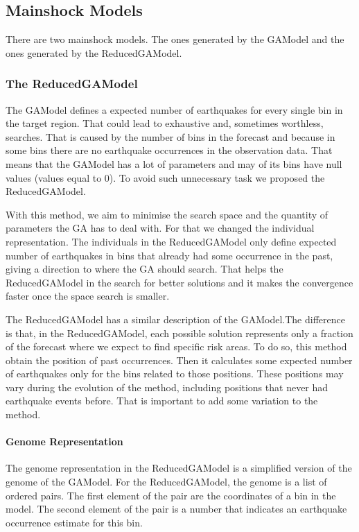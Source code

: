 \subsection{Mainshock Models}\label{mainshocksMethods}
There are two mainshock models. The ones generated by the GAModel and the ones generated by the ReducedGAModel.

\subsubsection{The ReducedGAModel}\label{ReducedGAModel}
The GAModel defines a expected number of earthquakes for every single bin in the target region. That could lead to exhaustive and, sometimes worthless, searches. That is caused by the number of bins in the forecast and because in some bins there are no earthquake occurrences in the observation data. That means that the GAModel has a lot of parameters and may of its bins have null values (values equal to 0). To avoid such unnecessary task we proposed the ReducedGAModel.

With this method, we aim to minimise the search space and the quantity of parameters the GA has to deal with. For that we changed the individual representation. The individuals in the ReducedGAModel only define expected number of earthquakes in bins that already had some occurrence in the past, giving a direction to where the GA should search. That helps the ReducedGAModel in the search for better solutions and it makes the convergence faster once the space search is smaller.

The ReducedGAModel has a similar description of the GAModel.The difference is that, in the ReducedGAModel, each possible solution represents only a fraction of the forecast where we expect to find specific risk areas. To do so, this method obtain the position of past occurrences. Then it calculates some expected number of earthquakes only for the bins related to those positions. These positions may vary during the evolution of the method, including positions that never had earthquake events before. That is important to add some variation to the method.


\paragraph{Genome Representation}\label{genomeReduced}
The genome representation in the ReducedGAModel is a simplified version of the genome of the GAModel. For the ReducedGAModel, the genome is a list of ordered pairs. The first element of the pair are the coordinates of a bin in the model. The second element of the pair is a number that indicates an earthquake occurrence estimate for this bin.

